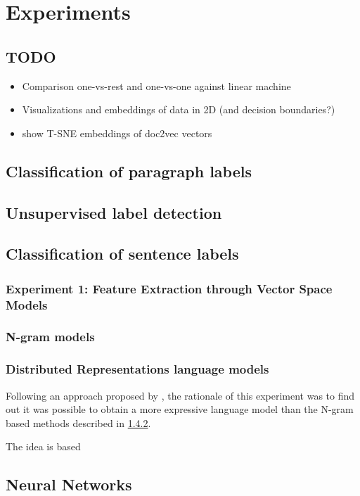 
\clearpage
\section{Experiments}

\subsection{TODO}

\begin{itemize}
  \item Comparison one-vs-rest and one-vs-one against linear machine
  \item Visualizations and embeddings of data in 2D (and decision boundaries?)
  \item show T-SNE embeddings of doc2vec vectors
\end{itemize}



\subsection{Classification of paragraph labels}

\subsection{Unsupervised label detection}



\subsection{Classification of sentence labels}

\subsubsection{Experiment 1: Feature Extraction through Vector Space Models}

\subsubsection{N-gram models}
\label{ngram-models}



\subsubsection{Distributed Representations language models}
\label{doc2vec}

Following an approach proposed by \cite{Le:2014aa}, the rationale of this experiment was to find out it was possible to obtain a more expressive language model than the N-gram based methods described in \ref{ngram-models}.

The idea is based

\subsection{Neural Networks}
